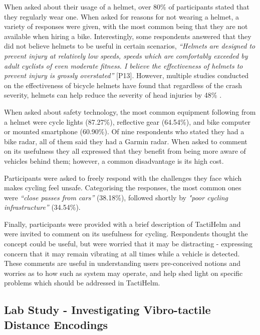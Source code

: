 \documentclass{interim}
\begin{document}
When asked about their usage of a helmet, over 80\% of participants stated that they regularly wear one. When asked for reasons for not wearing a helmet, a variety of responses were given, with the most common being that they are not available when hiring a bike. Interestingly, some respondents answered that they did not believe helmets to be useful in certain scenarios, \textit{“Helmets are designed to prevent injury at relatively low speeds, speeds which are comfortably exceeded by adult cyclists of even moderate fitness. I believe the effectiveness of helmets to prevent injury is grossly overstated”} [P13]. However, multiple studies conducted on the effectiveness of bicycle helmets \cite{10.1093/ije/dyw153, HOYE201885, HOYE2018239, buth2023effectiveness} have found that regardless of the crash severity, helmets can help reduce the severity of head injuries by 48\% \cite{HOYE201885}.

When asked about safety technology, the most common equipment following from a helmet were cycle lights (87.27\%), reflective gear (64.54\%), and bike computer or mounted smartphone (60.90\%). Of nine respondents who stated they had a bike radar, all of them said they had a Garmin radar. When asked to comment on its usefulness they all expressed that they benefit from being more aware of vehicles behind them; however, a common disadvantage is its high cost.

Participants were asked to freely respond with the challenges they face which makes cycling feel unsafe. Categorising the responses, the most common ones were \textit{“close passes from cars”} (38.18\%), followed shortly by \textit{"poor cycling infrastructure”} (34.54\%).

Finally, participants were provided with a brief description of TactiHelm and were invited to comment on its usefulness for cycling. Respondents thought the concept could be useful, but were worried that it may be distracting - expressing concern that it may remain vibrating at all times while a vehicle is detected. These comments are useful in understanding users pre-conceived notions and worries as to how such as system may operate, and help shed light on specific problems which should be addressed in TactiHelm.


\subsection{Lab Study - Investigating Vibro-tactile Distance Encodings}\label{sec:lab-study}
\end{document}
